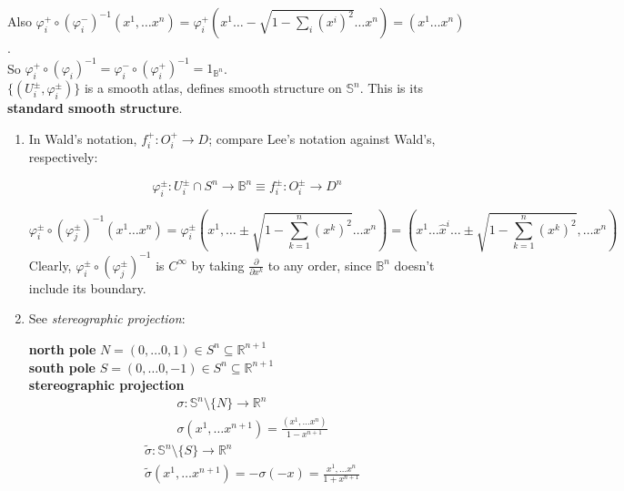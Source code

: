 Also $\varphi_i^+ \circ (\varphi_i^-)^{-1} (x^1, \dots x^n) = \varphi_i^{+} (x^1 \dots - \sqrt{1 - \sum_i(x^i)^2} \dots x^n) = (x^1 \dots x^n)$. \\

So $\varphi_i^+ \circ (\varphi_i)^{-1} = \varphi_i^- \circ (\varphi_i^+)^{-1} = 1_{\mathbb{B}^n}$. \\

$\lbrace (U_i^{\pm}, \varphi_i^{\pm}) \rbrace$ is a smooth atlas, defines smooth structure on $\mathbb{S}^n$. This is its \textbf{standard smooth structure}.


\begin{enumerate}
	\item[(a)] In Wald's notation, $f^+_i : O_i^+ \to D$; compare Lee's notation against Wald's, respectively:
	
	\[
	\varphi_i^{\pm} : U^{\pm}_i \cap S^n \to \mathbb{B}^n \equiv f_i^{\pm} : O_i^{\pm} \to D^n
	\]
	
	\[
	\varphi_i^{\pm} \circ (\varphi_j^{\pm})^{-1} (x^1 \dots x^n) = \varphi_i^{\pm}( x^1, \dots \pm \sqrt{ 1 -\sum_{k=1}^n (x^k)^2} \dots x^n) = (x^1 \dots \widehat{x}^i \dots \pm \sqrt{ 1 - \sum_{k=1}^n (x^k)^2 } , \dots x^n)
	\]
Clearly, $\varphi_i^{\pm} \circ (\varphi_j^{\pm})^{-1}$ is $C^{\infty}$ by taking $\frac{ \partial}{\partial x^k} $ to any order, since $\mathbb{B}^n$ doesn't include its boundary.

	\item[(b)] See \emph{stereographic projection}: 

	\textbf{north pole} $N = (0, \dots 0, 1) \in S^n \subseteq \mathbb{R}^{n+1}$ \\
\textbf{south pole} $S = (0, \dots 0,-1) \in S^n \subseteq \mathbb{R}^{n+1}$ \\
\textbf{stereographic projection} 
\[
\begin{aligned}
	& \sigma : \mathbb{S}^n \setminus \lbrace N \rbrace \to \mathbb{R}^n \\
	& \sigma(x^1 , \dots x^{n+1}) = \frac{ (x^1, \dots x^n ) }{ 1 - x^{n+1}} 
\end{aligned}
\]
\[
\begin{aligned}
	& \widetilde{\sigma}: \mathbb{S}^n \setminus \lbrace S \rbrace \to \mathbb{R}^n \\
	& \widetilde{\sigma}(x^1 , \dots x^{n+1}) = -\sigma(-x) = \frac{ x^1, \dots x^n }{ 1 + x^{n+1}}
\end{aligned}
\]

\end{enumerate}

